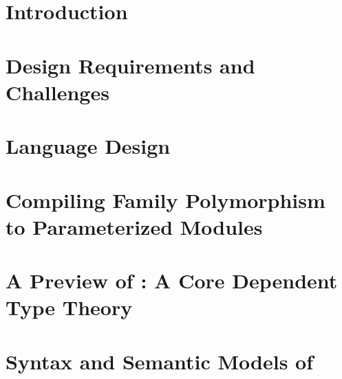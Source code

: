 



\newpage
{}
\setcounter{page}{1}



\section{Introduction}
\label{sec:intro}


\newpage
\section{Design Requirements and Challenges}
\label{sec:background+challenge}

\newpage
\section{Language Design}
\label{sec:lang-design}


\newpage
\section{Compiling Family Polymorphism to Parameterized Modules}
\label{sec:coqimpl}

\newpage
\section{A Preview of \TT: A Core Dependent Type Theory}
\label{sec:metatheory2}


\newpage
\section{Syntax and Semantic Models of \TT}
\label{sec:complete-fmltt}


